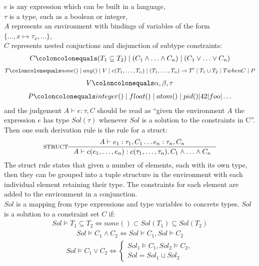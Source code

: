 \documentclass[12pt, titlepage]{article}
\begin{document}
$e$ is any expression which can be built in a language, \\
$\tau$ is a type, such as a boolean or integer, \\
$A$ represents an environment with bindings of variables of the form $\{\ldots, x \mapsto \tau_x, \ldots\}$, \\
$C$ represents nested conjuctions and disjunction of subtype constraints:
\begin{align*} 
	C \coloncolonequals (T_1 \subseteq T_2) \mid (C_1 \land \ldots \land C_n) \mid (C_1 \lor \ldots \lor C_n)
\end{align*}
\begin{align*} 
	T \coloncolonequals none() \mid any() \mid V \mid c(T_1, \ldots, T_n) \mid (T_1, \ldots, T_n) \rightarrow T'\mid T_1 \cup T_2 \mid T when C \mid P
\end{align*}
\begin{align*} 
	V \coloncolonequals \alpha, \beta, \tau
\end{align*}
\begin{align*} 
	P \coloncolonequals integer() \mid float() \mid atom() \mid pid()| 42 | foo | \ldots
\end{align*}
and the judgement $A \vdash e : \tau, C$ should be read as ``given the environment $A$ the expression $e$ has type $Sol(\tau)$ whenever $Sol$ is a solution to the constraints in C''. \\
Then one such derivation rule is the rule for a struct:
                \[
\inference*[STRUCT]{  A \vdash  e_1 : \tau_1, C_1 \ldots e_n : \tau_n, C_n}
                                        {A \vdash  c(e_1, \ldots, e_n) : c(\tau_1, \ldots, \tau_n), C_1 \land \ldots \land C_n}
                \]
The struct rule states that given a number of elements, each with its own type, then they can be grouped into a tuple structure in the environment with each individual element retaining their type. The constraints for each element are added to the environment in a conjunction. \\
$Sol$ is a mapping from type expressions and type variables to concrete types. $Sol$ is a solution to a constraint set $C$ if:
\begin{align*} 
	Sol \models T_1 \subseteq T_2 \iff none() \subset Sol(T_1) \subseteq Sol(T_2)
\end{align*}
\begin{align*} 
	Sol \models C_1 \land C_2 \iff Sol \models C_1, Sol \models  C_2
\end{align*}
\begin{align*} 
	Sol \models C_1 \lor C_2 \iff \begin{cases} Sol_1 \models C_1, Sol_2 \models C_2, \\
	                                            Sol = Sol_1 \sqcup Sol_2 \end{cases}
\end{align*}
\end{document}
